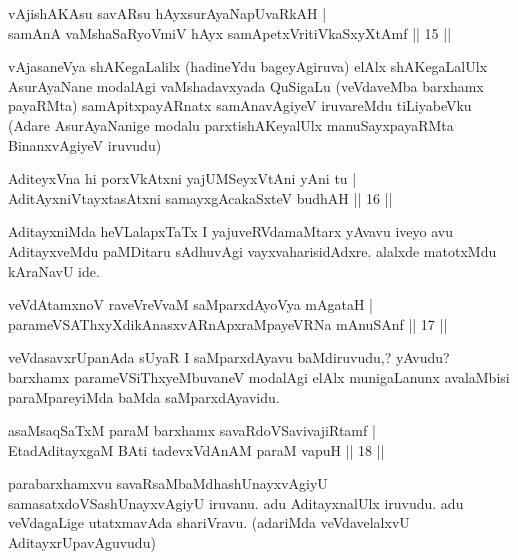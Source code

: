 \begin{shl}
vAjishAKAsu savARsu hAyxsurAyaNapUvaRkAH | \\
samAnA vaMshaSaRyoV\s miV hAyx samApetxVritiVkaSxyXtAmf \hfill||  15 ||  
\end{shl}

\begin{artha}
vAjasaneVya shAKegaLalilx (hadineYdu bageyAgiruva) elAlx shAKegaLalUlx AsurAyaNane modalAgi vaMshadavxyada QuSigaLu (veVdaveMba barxhamx payaRMta) samApitxpayARnatx samAnavAgiyeV iruvareMdu tiLiyabeVku (Adare AsurAyaNanige modalu parxtishAKeyalUlx manuSayxpayaRMta BinanxvAgiyeV iruvudu)
\end{artha}


\begin{shl}
AditeyxVna hi porxVkAtxni yajUMSeyxVtAni yAni tu | \\
AditAyxniVtayxtasAtxni samayxgAcakaSxteV budhAH \hfill||  16 ||  
\end{shl}

\begin{artha}
AditayxniMda heVLalapxTaTx I yajuveRVdamaMtarx yAvavu iveyo avu 
AditayxveMdu paMDitaru sAdhuvAgi vayxvaharisidAdxre. alalxde matotxMdu 
kAraNavU ide.
\end{artha}

\begin{shl}
veVdAtamxnoV raveVreVvaM saMparxdAyoV\s ya mAgataH | \\
parameVSAThxyXdikAnasxvARnApxraMpayeVRNa mAnuSAnf \hfill||  17 || 
\end{shl}

\begin{artha}
veVdasavxrUpanAda sUyaR I saMparxdAyavu baMdiruvudu,? yAvudu? barxhamx 
parameVSiThxyeMbuvaneV modalAgi elAlx munigaLanunx avalaMbisi 
paraMpareyiMda baMda saMparxdAyavidu.
\end{artha}

\begin{shl}
asaMsaqSaTxM paraM barxhamx savaRdoVSavivajiRtamf | \\
EtadAditayxgaM BAti tadevxVdAnAM paraM vapuH \hfill||  18 ||  
\end{shl}

\begin{artha}
parabarxhamxvu savaRsaMbaMdhashUnayxvAgiyU samasatxdoVSashUnayxvAgiyU 
iruvanu. adu AditayxnalUlx iruvudu. adu veVdagaLige utatxmavAda 
shariVravu. (adariMda veVdavelalxvU AditayxrUpavAguvudu)
\end{artha}

